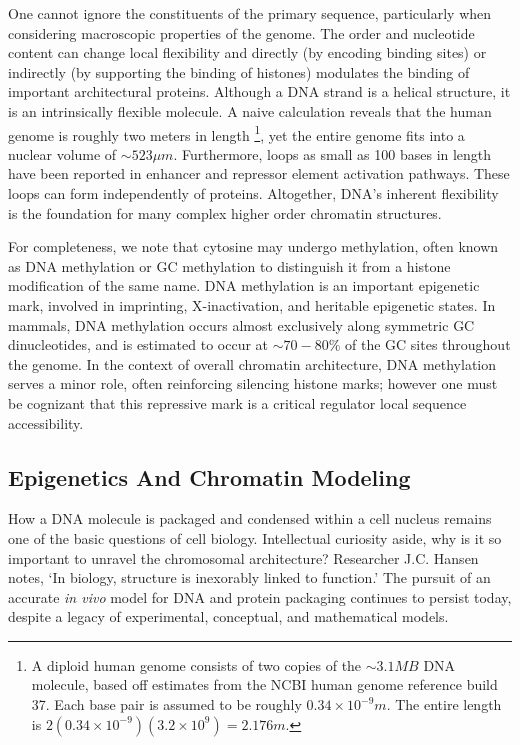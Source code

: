 One cannot ignore the constituents of the primary sequence, particularly when considering macroscopic properties of the genome.  The order and
nucleotide content can change local flexibility and directly (by encoding binding sites) or indirectly (by supporting the binding of histones)
modulates the binding of important architectural proteins\cite{travers2004}.  Although a \gls{DNA} strand is a helical structure, it is an intrinsically
flexible molecule.  A naive calculation reveals that the human genome is roughly two meters in length%
\footnote{%
  A diploid human genome consists of two copies of the $\sim3.1MB$ DNA molecule, based off estimates from the \gls{NCBI} human genome reference build 37.
  Each base pair is assumed to be roughly $0.34\times10^{-9}m$.  The entire length is $2(0.34 \times 10^{-9})(3.2 \times 10^9) = 2.176m$.
},
yet the entire genome fits into a nuclear volume of $\sim523\mu{}m$\cite{marks2011}.  Furthermore, loops as small as 100 bases in length have been
reported in enhancer and repressor element activation pathways\cite{wong2008}. These loops can form independently of proteins\cite{vafabakhsh2012}.
Altogether, \gls{DNA}'s inherent flexibility is the foundation for  many complex higher order chromatin structures.

For completeness, we note that cytosine may undergo methylation, often known as \gls{DNA} methylation or GC methylation to distinguish it
from a histone modification of the same name\cite{bird2002}.  \gls{DNA} methylation is an important epigenetic mark, involved in imprinting,
\gls{X-inactivation}, and heritable epigenetic states\cite{law2010}.  In mammals, \gls{DNA} methylation occurs almost exclusively along
symmetric \gls{GC} dinucleotides, and is estimated to occur at $\sim70-80\%$ of the \gls{GC} sites throughout the genome\cite{ehrlich1982,law2010}.
In the context of overall chromatin architecture, \gls{DNA} methylation serves a minor role, often reinforcing silencing histone marks; however
one must be cognizant that this repressive mark is a critical regulator local sequence accessibility.

\subsection*{Epigenetics And Chromatin Modeling}

How a \gls{DNA} molecule is packaged and condensed within a cell nucleus remains one of the basic questions of cell biology.  Intellectual curiosity aside,
why is it so important to unravel the chromosomal architecture?  Researcher J.C. Hansen notes, `In biology, structure is inexorably linked to function.'\cite{hansen2012}
The pursuit of an accurate \textit{\gls{in vivo}} model for \gls{DNA} and protein packaging continues to persist today, despite a legacy of experimental,
conceptual, and mathematical models.

